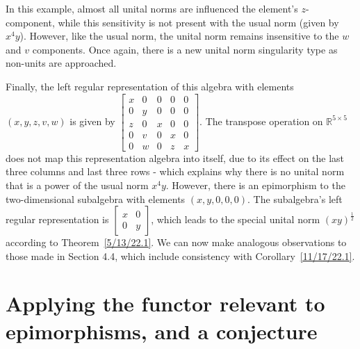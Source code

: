 \documentclass{amsart}
\numberwithin{equation}{section}
\theoremstyle{definition}
\numberwithin{theorem}{section}
\begin{document}
In this example, almost all unital norms are influenced the element's $z$-component, while this sensitivity is not present with the usual norm (given by $x^4y$).  However, like the usual norm,  the unital norm remains insensitive to the $w$ and $v$ components.  Once again, there is a new unital norm singularity type as non-units are approached.  

Finally, the left regular representation of this algebra with elements $(x,y,z,v,w)$ is given by $ \left[
\begin{array}{ccccc}
x & 0 & 0 & 0 & 0   \\
0 & y & 0 & 0 & 0 \\
z & 0 &  x & 0 & 0  \\
0 & v &  0 & x & 0  \\
0 & w &  0 & z & x
\end{array}
\right].$ 
The transpose operation on $\mathbb{R}^{5\times 5}$ does not map this representation algebra into itself, due to its effect on the last three columns and last three rows - which explains why there is no unital norm that is a power of the usual norm $x^4y$.  However, there is an epimorphism to the two-dimensional subalgebra with elements $(x,y,0,0,0)$.  The subalgebra's left regular representation is $\left[\begin{array}{ccc}
x & 0  \\
 0 & y  
\end{array} \right]$, which leads to the special unital norm $(xy)^\frac{1}{2}$ according to \mbox{Theorem \ref{5/13/22.1}}.  We can now make analogous observations to those made in Section 4.4, which include consistency with \mbox{Corollary \ref{11/17/22.1}}.
 
\section{Applying the functor relevant to epimorphisms, and a conjecture}
\end{document}
